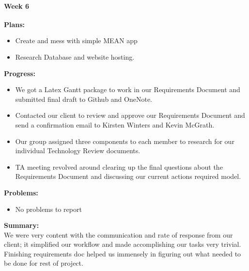 \paragraph{Week 6}
\begin{adjustwidth}{2.5em}{0pt}
    \vspace{-0.5cm}\textbf{Plans:}
    \vspace{-0.5cm}
    \begin{itemize}
        \item Create and mess with simple MEAN app 
        \item Research Database and website hosting. 
    \end{itemize} 
    \vspace{-0.3cm}\textbf{Progress:}
    \vspace{-0.5cm}
    \begin{itemize}
        \item We got a Latex Gantt package to work in our Requirements Document and submitted final draft to Github and OneNote. 
        \item Contacted our client to review and approve our Requirements Document and send a confirmation email to Kirsten Winters and Kevin McGrath.
        \item Our group assigned three components to each member to research for our individual Technology Review documents.
		\item TA meeting revolved around clearing up the final questions about the Requirements Document and discussing our current actions required model.
    \end{itemize} 
    \vspace{-0.3cm}\textbf{Problems:}
    \vspace{-0.5cm}
    \begin{itemize}
        \item No problems to report
    \end{itemize}  
    \vspace{-0.3cm}\noindent\textbf{Summary:}\\
    \noindent  We were very content with the communication and rate of response from our client; it simplified our workflow and made accomplishing our tasks very trivial. Finishing requirements doc helped us immensely in figuring out what needed to be done for rest of project. 
	\end{adjustwidth} 
